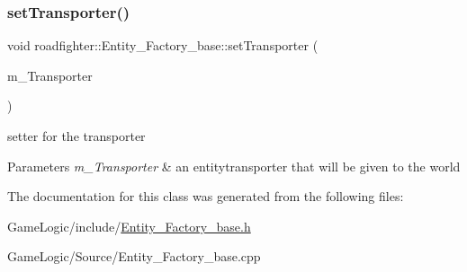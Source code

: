 \subsubsection{\texorpdfstring{set\+Transporter()}{setTransporter()}}
{\footnotesize\ttfamily void roadfighter\+::\+Entity\+\_\+\+Factory\+\_\+base\+::set\+Transporter (\begin{DoxyParamCaption}\item[{const std\+::shared\+\_\+ptr$<$ \hyperlink{classroadfighter_1_1EntityTransporter}{Entity\+Transporter} $>$ \&}]{m\+\_\+\+Transporter }\end{DoxyParamCaption})}

setter for the transporter 
\begin{DoxyParams}{Parameters}
{\em m\+\_\+\+Transporter} & an entitytransporter that will be given to the world \\
\hline
\end{DoxyParams}


The documentation for this class was generated from the following files\+:\begin{DoxyCompactItemize}
\item 
Game\+Logic/include/\hyperlink{Entity__Factory__base_8h}{Entity\+\_\+\+Factory\+\_\+base.\+h}\item 
Game\+Logic/\+Source/Entity\+\_\+\+Factory\+\_\+base.\+cpp\end{DoxyCompactItemize}
